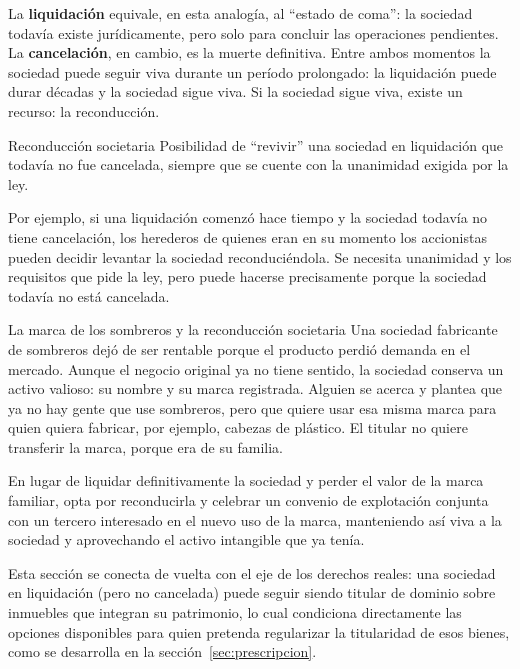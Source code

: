 \documentclass[12pt,oneside]{book}
\begin{document}
La \textbf{liquidación} equivale, en esta analogía, al ``estado de coma'': la sociedad todavía existe jurídicamente, pero solo para concluir las operaciones pendientes. La \textbf{cancelación}, en cambio, es la muerte definitiva. Entre ambos momentos la sociedad puede seguir viva durante un período prolongado: la liquidación puede durar décadas y la sociedad sigue viva. Si la sociedad sigue viva, existe un recurso: la reconducción.

\begin{definition}{Reconducción societaria}
Posibilidad de ``revivir'' una sociedad en liquidación que todavía no fue cancelada, siempre que se cuente con la unanimidad exigida por la ley.
\end{definition}

Por ejemplo, si una liquidación comenzó hace tiempo y la sociedad todavía no tiene cancelación, los herederos de quienes eran en su momento los accionistas pueden decidir levantar la sociedad reconduciéndola. Se necesita unanimidad y los requisitos que pide la ley, pero puede hacerse precisamente porque la sociedad todavía no está cancelada.

\begin{example}{La marca de los sombreros y la reconducción societaria}
Una sociedad fabricante de sombreros dejó de ser rentable porque el producto perdió demanda en el mercado. Aunque el negocio original ya no tiene sentido, la sociedad conserva un activo valioso: su nombre y su marca registrada. Alguien se acerca y plantea que ya no hay gente que use sombreros, pero que quiere usar esa misma marca para quien quiera fabricar, por ejemplo, cabezas de plástico. El titular no quiere transferir la marca, porque era de su familia.

En lugar de liquidar definitivamente la sociedad y perder el valor de la marca familiar, opta por reconducirla y celebrar un convenio de explotación conjunta con un tercero interesado en el nuevo uso de la marca, manteniendo así viva a la sociedad y aprovechando el activo intangible que ya tenía.
\end{example}

Esta sección se conecta de vuelta con el eje de los derechos reales: una sociedad en liquidación (pero no cancelada) puede seguir siendo titular de dominio sobre inmuebles que integran su patrimonio, lo cual condiciona directamente las opciones disponibles para quien pretenda regularizar la titularidad de esos bienes, como se desarrolla en la sección~\ref{sec:prescripcion}.
\end{document}
